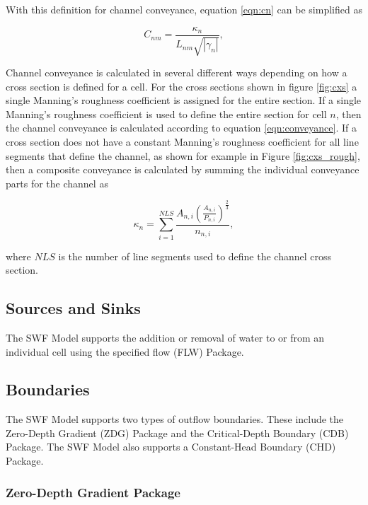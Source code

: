 \documentclass[fleqn]{article}
\begin{document}
With this definition for channel conveyance, equation \ref{eqn:cn} can be simplified as

\begin{equation}
  C_{nm} = 
  \frac{
  \kappa_n 
  }
  {
  L_{nm}
  \sqrt{| \gamma_n |}
  },
\label{eqn:cn2}
\end{equation}

Channel conveyance is calculated in several different ways depending on how a cross section is defined for a cell.  For the cross sections shown in figure \ref{fig:cxs} a single Manning's roughness coefficient is assigned for the entire section.  If a single Manning's roughness coefficient is used to define the entire section for cell $n$, then the channel conveyance is calculated according to equation \ref{eqn:conveyance}.  If a cross section does not have a constant Manning's roughness coefficient for all line segments that define the channel, as shown for example in Figure \ref{fig:cxs_rough}, then a composite conveyance is calculated by summing the individual conveyance parts for the channel as

\begin{equation}
  \kappa_n = \sum_{i=1}^{NLS} \frac{A_{n,i} \left ( \frac {A_{n,i}}{P_{n,i}}\right )^{\frac{2}{3}}}{n_{n,i}},
\end{equation}

\noindent where $NLS$ is the number of line segments used to define the channel cross section.


\subsection{Sources and Sinks}

The SWF Model supports the addition or removal of water to or from an individual cell using the specified flow (FLW) Package.  


\subsection{Boundaries}
The SWF Model supports two types of outflow boundaries.  These include the Zero-Depth Gradient (ZDG) Package and the Critical-Depth Boundary (CDB) Package.  The SWF Model also supports a Constant-Head Boundary (CHD) Package.


\subsubsection{Zero-Depth Gradient Package}
\end{document}
